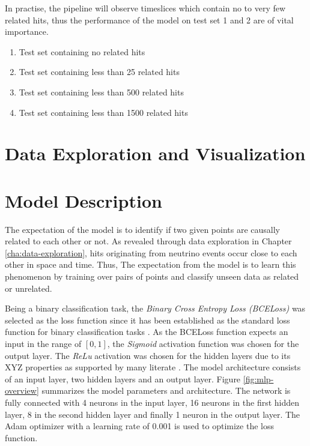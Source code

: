 In practise, the pipeline will observe timeslices which contain no to
very few related hits, thus the performance of the model on test set
1 and 2 are of vital importance.

\begin{enumerate}
\item Test set containing no related hits
\item Test set containing less than 25 related hits
\item Test set containing less than 500 related hits
\item Test set containing less than 1500 related hits
\end{enumerate}

\section{Data Exploration and Visualization}

\section{Model Description}
The expectation of the model is to identify if two given points are
causally related to each other or not. As revealed through data
exploration in Chapter \ref{cha:data-exploration}, hits originating from
neutrino events occur close to each other in space and time. Thus, The
expectation from the model is to learn this phenomenon by training
over pairs of points and classify unseen data as related or unrelated.

Being a binary classification task, the \textit{Binary Cross Entropy
  Loss (BCELoss)} was selected as the loss function since it has been
established as the standard loss function for binary classification
tasks \cite{CITEME}. As the BCELoss function expects an input in the
range of $[0, 1]$, the \textit{Sigmoid} activation function was chosen
for the output layer. The \textit{ReLu} activation was chosen for the
hidden layers due to its XYZ properties as supported by many literate
\cite{CITME}. The model architecture consists of an input layer, two
hidden layers and an output layer. Figure \ref{fig:mlp-overview}
summarizes the model parameters and architecture. The network is fully
connected with 4 neurons in the input layer, 16 neurons in the first
hidden layer, 8 in the second hidden layer and finally 1 neuron in the
output layer. The Adam optimizer with a learning rate of 0.001 is used
to optimize the loss function.

